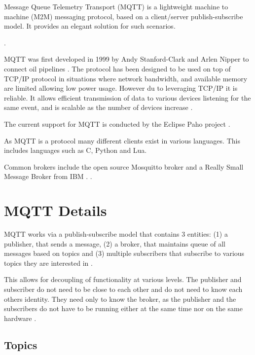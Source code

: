 \documentclass[sigconf]{acmart}
\begin{document}
Message Queue Telemetry Transport (MQTT) is a lightweight machine to
machine (M2M) messaging protocol, based on a client/server 
publish-subscribe model. It provides an elegant solution for such
scenarios.

.

MQTT was first developed in 1999 by Andy Stanford-Clark and
Arlen Nipper to connect oil pipelines \cite{hivemq-website}. The
protocol has been designed to be used on top of TCP/IP protocol in
situations where network bandwidth, and available memory are limited
allowing low power usage. However du to leveraging TCP/IP it is
reliable. It allows efficient transmission of data to
various devices listening for the same event, and is scalable as the
number of devices increase \cite{mqtt-wiki}\cite{mqtt-official}.

The current support for MQTT is conducted by the Eclipse Paho project \cite{eclipse-mosquitto}.

As MQTT is a protocol many different clients exist in 
various languages. This includes languages such as C, Python and Lua. 

Common brokers include the open
source Mosquitto broker \cite{mqtt-official} and a Really Small Message Broker from IBM
\cite{eclipse-mosquitto}.
.


\section{MQTT Details}

MQTT works via a publish-subscribe model that contains 3 entities: (1) a
publisher, that sends a message, (2) a broker, that maintains queue of all
messages based on topics and (3) multiple subscribers that subscribe to
various topics they are interested in \cite{how-mqtt-works}.

This allows for decoupling of functionality at various levels. The
publisher and subscriber do not need to be close to each other and do
not need to know each others identity. They need only to know the
broker, as the publisher and the subscribers do not have to be running
either at the same time nor on the same hardware
\cite{hivemq-details}.


%
%


\subsection{Topics}
\end{document}
